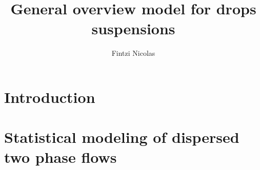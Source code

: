 \documentclass[12pt,a4paper,oneside,openany]{My_book}
\title{General overview model for drops suspensions}
\author{Fintzi Nicolas}
\begin{document}
\dominitoc

\frontmatter
\pagestyle{plain}




\mainmatter

\part{Introduction}



\part{Statistical modeling of dispersed two phase flows}

\adjustmtc
\end{document}
